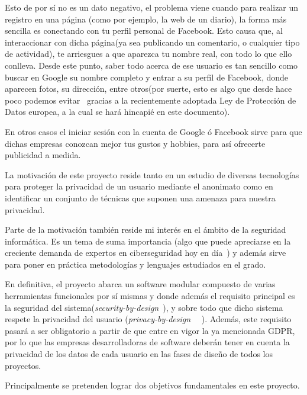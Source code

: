 Esto de por sí no es un dato negativo, el problema viene cuando para realizar un registro en una página (como por ejemplo, la web de un diario), la forma más sencilla es conectando con tu perfil personal de Facebook. Esto causa que, al interaccionar con dicha página(ya sea publicando un comentario, o cualquier tipo de actividad), te arriesgues a que aparezca tu nombre real, con todo lo que ello conlleva. Desde este punto, saber todo acerca de ese usuario es tan sencillo como buscar en Google su nombre completo y entrar a su perfil de Facebook, donde aparecen fotos, su dirección, entre otros(por suerte, esto es algo que desde hace poco podemos evitar~\cite{article:GDPRGoogle} gracias a la recientemente adoptada Ley de Protección de Datos europea, a la cual se hará hincapié en este documento).

En otros casos el iniciar sesión con la cuenta de Google ó Facebook sirve para que dichas empresas conozcan mejor tus gustos y hobbies, para así ofrecerte publicidad a medida. 

La motivación de este proyecto reside tanto en un estudio de diversas tecnologías para proteger la privacidad de un usuario mediante el anonimato como en identificar un conjunto de técnicas que suponen una amenaza para nuestra privacidad.
 
Parte de la motivación también reside mi interés en el ámbito de la seguridad informática. Es un tema de suma importancia (algo que puede apreciarse en la creciente demanda de expertos en ciberseguridad hoy en día~\cite{article:expCiberseguridad}) y además sirve para poner en práctica metodologías y lenguajes estudiados en el grado. 

En definitiva, el proyecto  abarca un software modular compuesto de varias herramientas funcionales por sí mismas y donde además el requisito principal es la seguridad del sistema(\textit{security-by-design}~\cite{paper:secbydesign}), y sobre todo que dicho sistema respete la privacidad del usuario (\textit{privacy-by-design}~\cite{paper:privacybydesign} ~\cite{cavoukian2009privacy}). Además, este requisito pasará a ser obligatorio a partir de que entre en vigor la ya mencionada GDPR, por lo que las empresas desarrolladoras de software deberán tener en cuenta la privacidad de los datos de cada usuario en las fases de diseño de todos los proyectos.



Principalmente se pretenden lograr dos objetivos fundamentales en este proyecto.

